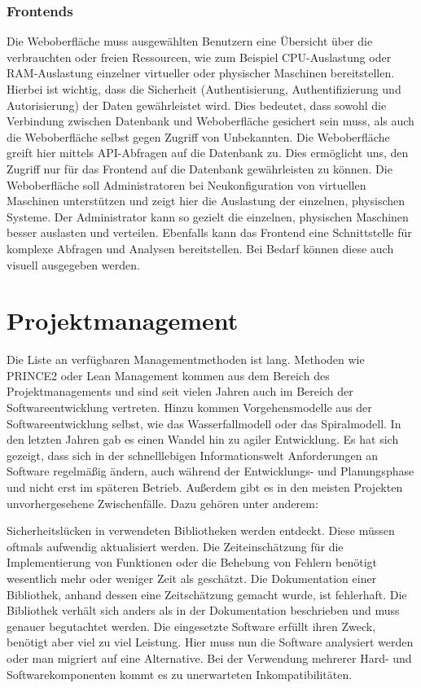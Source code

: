\subsection{Frontends}
Die Weboberfläche muss ausgewählten Benutzern eine Übersicht über die
verbrauchten oder freien Ressourcen, wie zum Beispiel CPU-Auslastung oder
RAM-Auslastung einzelner virtueller oder physischer Maschinen bereitstellen.
Hierbei ist wichtig, dass die Sicherheit (Authentisierung, Authentifizierung
und Autorisierung) der Daten gewährleistet wird. Dies bedeutet, dass sowohl die
Verbindung zwischen Datenbank und Weboberfläche gesichert sein muss, als auch
die Weboberfläche selbst gegen Zugriff von Unbekannten. Die Weboberfläche
greift hier mittels API-Abfragen auf die Datenbank zu. Dies ermöglicht uns, den
Zugriff nur für das Frontend auf die Datenbank gewährleisten zu können. Die
Weboberfläche soll Administratoren bei Neukonfiguration von virtuellen
Maschinen unterstützen und zeigt hier die Auslastung der einzelnen, physischen
Systeme. Der Administrator kann so gezielt die einzelnen, physischen Maschinen
besser auslasten und verteilen. Ebenfalls kann das Frontend eine Schnittstelle
für komplexe Abfragen und Analysen bereitstellen. Bei Bedarf können diese auch
visuell ausgegeben werden.
\mr%

\chapter{Projektmanagement}
Die Liste an verfügbaren Managementmethoden ist lang. Methoden wie PRINCE2 oder
Lean Management kommen aus dem Bereich des Projektmanagements und sind seit
vielen Jahren auch im Bereich der Softwareentwicklung vertreten. Hinzu kommen
Vorgehensmodelle aus der Softwareentwicklung selbst, wie das Wasserfallmodell
oder das Spiralmodell. In den letzten Jahren gab es einen Wandel hin zu agiler
Entwicklung. Es hat sich gezeigt, dass sich in der schnelllebigen
Informationswelt Anforderungen an Software regelmäßig ändern, auch während der
Entwicklungs- und Planungsphase und nicht erst im späteren Betrieb. Außerdem
gibt es in den meisten Projekten unvorhergesehene Zwischenfälle. Dazu gehören
unter anderem:

\begin{outline}
  \1 Sicherheitslücken in verwendeten Bibliotheken werden entdeckt. Diese
  müssen oftmals aufwendig aktualisiert werden.
  \1 Die Zeiteinschätzung für die Implementierung von Funktionen oder die
  Behebung von Fehlern benötigt wesentlich mehr oder weniger Zeit als
  geschätzt.
  \1 Die Dokumentation einer Bibliothek, anhand dessen eine Zeitschätzung
  gemacht wurde, ist fehlerhaft. Die Bibliothek verhält sich anders als in der
  Dokumentation beschrieben und muss genauer begutachtet werden.
  \1 Die eingesetzte Software erfüllt ihren Zweck, benötigt aber viel zu viel
  Leistung. Hier muss nun die Software analysiert werden oder man migriert auf
  eine Alternative.
  \1 Bei der Verwendung mehrerer Hard- und Softwarekomponenten kommt es zu
  unerwarteten Inkompatibilitäten.
\end{outline}

